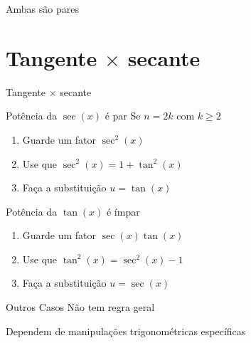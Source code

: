 \begin{frame}{Ambas são pares}

\end{frame}

\section{Tangente $\times$ secante}

\begin{frame}{Tangente $\times$ secante}

\end{frame}

\begin{frame}{Potência da $\sec(x)$ é par}
  Se $n = 2k$ com $k \geq 2$
  \begin{enumerate}[<+->]
    \setlength\itemsep{1em}
    \item Guarde um fator $\sec^2(x)$
    \item Use que $\sec^2(x) = 1 + \tan^2(x)$
    \item Faça a substituição $u = \tan(x)$
  \end{enumerate}
\end{frame}

\begin{frame}{Potência da $\tan(x)$ é ímpar}
  \begin{enumerate}[<+->]
    \setlength\itemsep{1em}
    \item Guarde um fator $\sec(x)\tan(x)$
    \item Use que $\tan^2(x)=\sec^2(x)-1$
    \item Faça a substituição $u=\sec(x)$
  \end{enumerate}
\end{frame}

\begin{frame}{Outros Casos}
  Não tem regra geral

  Dependem de manipulações trigonométricas específicas
\end{frame}

